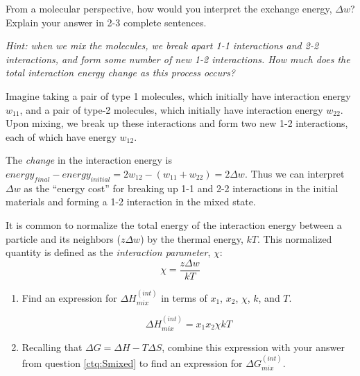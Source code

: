 \begin{activity}
\begin{ctqs}
		
	\question From a molecular perspective, how would you interpret the exchange energy, $\Delta w$?  Explain your answer in 2-3 complete sentences.
	
		\emph{Hint: when we mix the molecules, we break apart 1-1 interactions and 2-2 interactions, and form some number of new 1-2 interactions.  How much does the total interaction energy change as this process occurs?}
		
		\begin{solution}[3in]
		
			Imagine taking a pair of type 1 molecules, which initially have interaction energy $w_{11}$, and a pair of type-2 molecules, which initially have interaction energy $w_{22}$.  Upon mixing, we break up these interactions and form two new 1-2 interactions, each of which have energy $w_{12}$.
			
			The \emph{change} in the interaction energy is $energy_{final} - energy_{initial} = 2w_{12} - (w_{11} + w_{22}) = 2\Delta w$.  Thus we can interpret $\Delta w$ as the ``energy cost'' for breaking up 1-1 and 2-2 interactions in the initial materials and forming a 1-2 interaction in the mixed state.
			
		\end{solution}
			

	\question It is common to normalize the total energy of the interaction energy between a particle and its neighbors ($z\Delta w$) by the thermal energy, $kT$.  This normalized quantity is defined as the \emph{interaction parameter}, $\chi$:
		\begin{equation*}
			\chi = \frac{z\Delta w}{kT}
		\end{equation*}
	
		\begin{enumerate}
			\item Find an expression for $\Delta H_{mix}^{(int)}$ in terms of $x_1$, $x_2$, $\chi$, $k$, and $T$.
		
			\begin{solution}[1in]
				\begin{equation*}
					\Delta H_{mix}^{(int)} = x_1 x_2 \chi kT
				\end{equation*}
			\end{solution}

			\item Recalling that $\Delta G = \Delta H - T\Delta S$, combine this expression with your answer from question \ref{ctq:Smixed} to find an expression for $\Delta G_{mix}^{(int)}$.
			

\end{enumerate}
\end{ctqs}
\end{activity}
